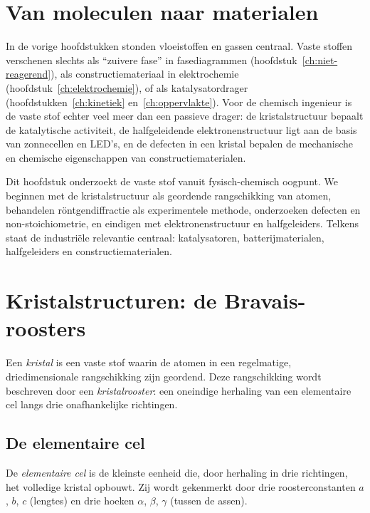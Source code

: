 \section{Van moleculen naar materialen}

In de vorige hoofdstukken stonden vloeistoffen en gassen centraal. Vaste stoffen verschenen slechts als ``zuivere fase'' in fasediagrammen (hoofdstuk~\ref{ch:niet-reagerend}), als constructiemateriaal in elektrochemie (hoofdstuk~\ref{ch:elektrochemie}), of als katalysatordrager (hoofdstukken~\ref{ch:kinetiek} en~\ref{ch:oppervlakte}). Voor de chemisch ingenieur is de vaste stof echter veel meer dan een passieve drager: de kristalstructuur bepaalt de katalytische activiteit, de halfgeleidende elektronenstructuur ligt aan de basis van zonnecellen en LED's, en de defecten in een kristal bepalen de mechanische en chemische eigenschappen van constructiematerialen.

Dit hoofdstuk onderzoekt de vaste stof vanuit fysisch-chemisch oogpunt. We beginnen met de kristalstructuur als geordende rangschikking van atomen, behandelen r\"ontgendiffractie als experimentele methode, onderzoeken defecten en non-stoichiometrie, en eindigen met elektronenstructuur en halfgeleiders. Telkens staat de industri\"ele relevantie centraal: katalysatoren, batterijmaterialen, halfgeleiders en constructiematerialen.

\section{Kristalstructuren: de Bravais-roosters}
\label{sec:bravais}

Een \emph{kristal} is een vaste stof waarin de atomen in een regelmatige, driedimensionale rangschikking zijn geordend. Deze rangschikking wordt beschreven door een \emph{kristalrooster}: een oneindige herhaling van een elementaire cel langs drie onafhankelijke richtingen.

\subsection{De elementaire cel}

De \emph{elementaire cel} is de kleinste eenheid die, door herhaling in drie richtingen, het volledige kristal opbouwt. Zij wordt gekenmerkt door drie roosterconstanten $a$, $b$, $c$ (lengtes) en drie hoeken $\alpha$, $\beta$, $\gamma$ (tussen de assen).

